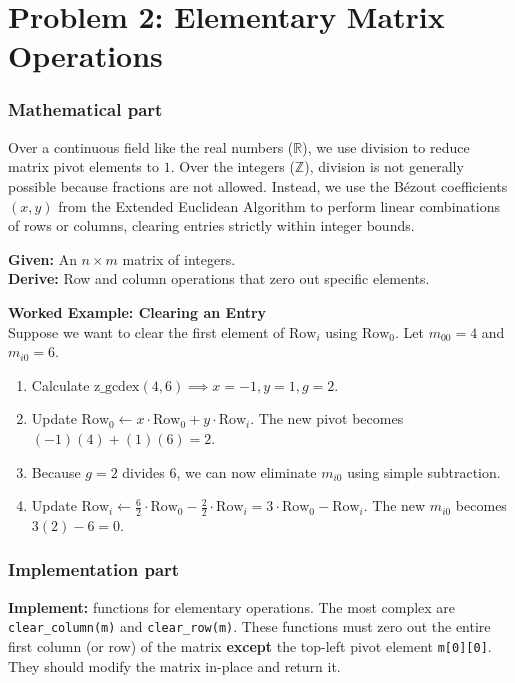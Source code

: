 \documentclass[11pt]{article}
\begin{document}
\section*{Problem 2: Elementary Matrix Operations}

\subsubsection*{Mathematical part}
Over a continuous field like the real numbers ($\mathbb{R}$), we use division to reduce matrix pivot elements to $1$. Over the integers ($\mathbb{Z}$), division is not generally possible because fractions are not allowed. Instead, we use the Bézout coefficients $(x, y)$ from the Extended Euclidean Algorithm to perform linear combinations of rows or columns, clearing entries strictly within integer bounds.

\textbf{Given:} An $n \times m$ matrix of integers. \\
\textbf{Derive:} Row and column operations that zero out specific elements.

\vspace{0.5cm}
\noindent\textbf{Worked Example: Clearing an Entry} \\
Suppose we want to clear the first element of $\text{Row}_i$ using $\text{Row}_0$. Let $m_{00} = 4$ and $m_{i0} = 6$.
\begin{enumerate}
    \item Calculate $\text{z\_gcdex}(4, 6) \implies x = -1, y = 1, g = 2$.
    \item Update $\text{Row}_0 \leftarrow x\cdot\text{Row}_0 + y\cdot\text{Row}_i$. The new pivot becomes $(-1)(4) + (1)(6) = 2$.
    \item Because $g = 2$ divides $6$, we can now eliminate $m_{i0}$ using simple subtraction.
    \item Update $\text{Row}_i \leftarrow \frac{6}{2}\cdot\text{Row}_0 - \frac{2}{2}\cdot\text{Row}_i = 3\cdot\text{Row}_0 - \text{Row}_i$. The new $m_{i0}$ becomes $3(2) - 6 = 0$.
\end{enumerate}

\subsubsection*{Implementation part}
\textbf{Implement:} functions for elementary operations. The most complex are \lstinline|clear_column(m)| and \lstinline|clear_row(m)|. These functions must zero out the entire first column (or row) of the matrix \textbf{except} the top-left pivot element \lstinline|m[0][0]|. They should modify the matrix in-place and return it.
\end{document}
